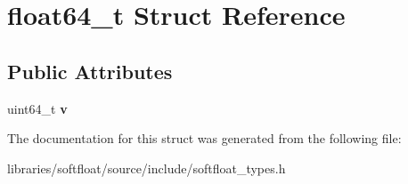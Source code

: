 \hypertarget{structfloat64__t}{}\section{float64\+\_\+t Struct Reference}
\label{structfloat64__t}
\subsection*{Public Attributes}
\begin{DoxyCompactItemize}
\item 
\mbox{\label{structfloat64__t_aa159a2b9284da76c25cb09ef68627628}} 
uint64\+\_\+t {\bfseries v}
\end{DoxyCompactItemize}


The documentation for this struct was generated from the following file\+:\begin{DoxyCompactItemize}
\item 
libraries/softfloat/source/include/softfloat\+\_\+types.\+h\end{DoxyCompactItemize}

